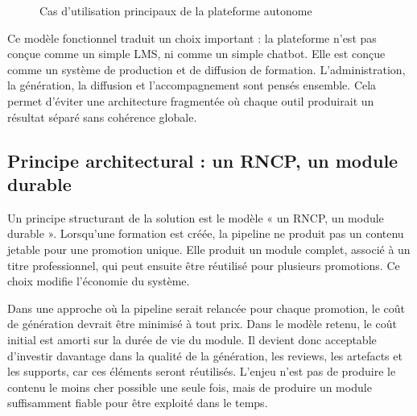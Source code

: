 \documentclass[12pt,a4paper]{article}
\begin{document}
\begin{figure}[h]
\centering
{}
\caption{Cas d'utilisation principaux de la plateforme autonome}
\end{figure}

Ce modèle fonctionnel traduit un choix important : la plateforme n'est pas conçue comme
un simple LMS, ni comme un simple chatbot. Elle est conçue comme un système de
production et de diffusion de formation. L'administration, la génération, la diffusion et
l'accompagnement sont pensés ensemble. Cela permet d'éviter une architecture fragmentée
où chaque outil produirait un résultat séparé sans cohérence globale.

\subsection{Principe architectural : un RNCP, un module durable}

Un principe structurant de la solution est le modèle « un RNCP, un module durable ».
Lorsqu'une formation est créée, la pipeline ne produit pas un contenu jetable pour une
promotion unique. Elle produit un module complet, associé à un titre professionnel, qui
peut ensuite être réutilisé pour plusieurs promotions. Ce choix modifie l'économie du
système.

Dans une approche où la pipeline serait relancée pour chaque promotion, le coût de
génération devrait être minimisé à tout prix. Dans le modèle retenu, le coût initial est
amorti sur la durée de vie du module. Il devient donc acceptable d'investir davantage dans
la qualité de la génération, les reviews, les artefacts et les supports, car ces éléments
seront réutilisés. L'enjeu n'est pas de produire le contenu le moins cher possible une seule
fois, mais de produire un module suffisamment fiable pour être exploité dans le temps.
\end{document}
